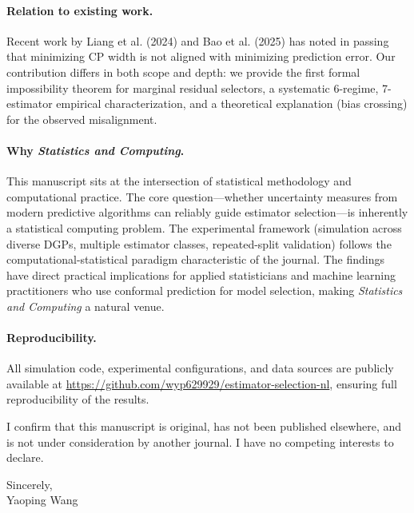 \documentclass[a4paper,11pt]{article}
\begin{document}
\paragraph{Relation to existing work.}
Recent work by Liang et al. (2024) and Bao et al. (2025) has noted in passing that minimizing CP width is not aligned with minimizing prediction error. Our contribution differs in both scope and depth: we provide the first formal impossibility theorem for marginal residual selectors, a systematic 6-regime, 7-estimator empirical characterization, and a theoretical explanation (bias crossing) for the observed misalignment.

\paragraph{Why \textit{Statistics and Computing}.}
This manuscript sits at the intersection of statistical methodology and computational practice. The core question---whether uncertainty measures from modern predictive algorithms can reliably guide estimator selection---is inherently a statistical computing problem. The experimental framework (simulation across diverse DGPs, multiple estimator classes, repeated-split validation) follows the computational-statistical paradigm characteristic of the journal. The findings have direct practical implications for applied statisticians and machine learning practitioners who use conformal prediction for model selection, making \textit{Statistics and Computing} a natural venue.

\paragraph{Reproducibility.}
All simulation code, experimental configurations, and data sources are publicly available at \url{https://github.com/wyp629929/estimator-selection-nl}, ensuring full reproducibility of the results.

\vspace{2em}

I confirm that this manuscript is original, has not been published elsewhere, and is not under consideration by another journal. I have no competing interests to declare.

\vspace{3em}

Sincerely,\\
Yaoping Wang
\end{document}

